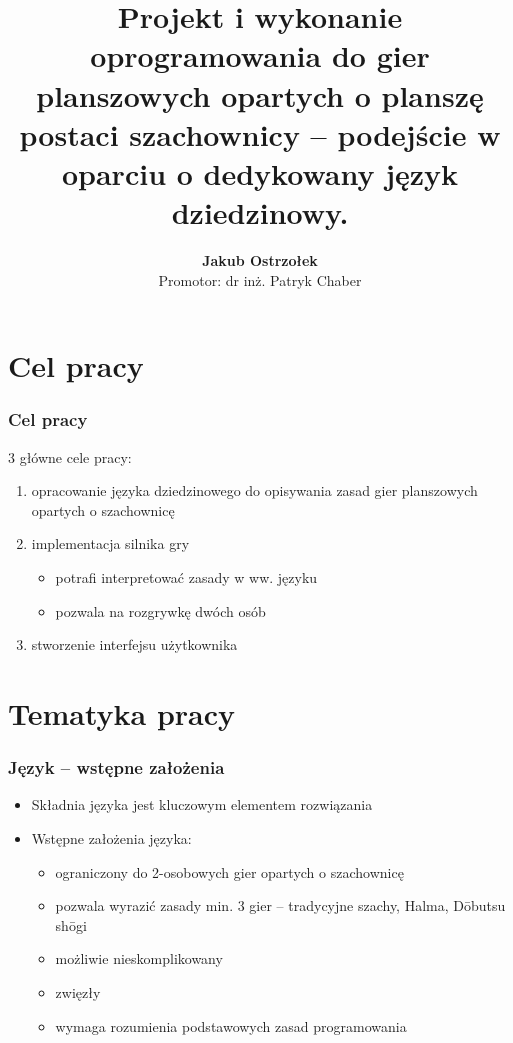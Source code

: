 \documentclass{beamer}
\title[Silnik gier opartych o szachownicę \insertframenumber/\inserttotalframenumber]{
   Projekt i wykonanie oprogramowania do gier planszowych opartych
   o planszę postaci szachownicy -- podejście w oparciu o dedykowany
   język dziedzinowy.}
\author[Jakub Ostrzołek]{\textbf{Jakub Ostrzołek} \\%
\footnotesize Promotor: dr inż. Patryk Chaber}
\institute{Instytut Automatyki i Technik Informacyjnych\\%
Politechnika Warszawska}
\begin{document}
\frame{\titlepage}


\section{Cel pracy}

\begin{frame}
	\frametitle{Cel pracy}
	3 główne cele pracy:
	\begin{enumerate}
		\item opracowanie języka dziedzinowego do opisywania zasad gier planszowych opartych o szachownicę
		\item implementacja silnika gry
		      \begin{itemize}
			      \item potrafi interpretować zasady w ww. języku
			      \item pozwala na rozgrywkę dwóch osób
		      \end{itemize}
		\item stworzenie interfejsu użytkownika
	\end{enumerate}
\end{frame}

\section{Tematyka pracy}

\begin{frame}
	\frametitle{Język -- wstępne założenia}
	\begin{itemize}
		\item Składnia języka jest kluczowym elementem rozwiązania
		\item Wstępne założenia języka:
		      \begin{itemize}
			      \item ograniczony do 2-osobowych gier opartych o szachownicę
			      \item pozwala wyrazić zasady min. 3 gier -- tradycyjne szachy, Halma, Dōbutsu shōgi
			      \item możliwie nieskomplikowany
			      \item zwięzły
			      \item wymaga rozumienia podstawowych zasad programowania
		      \end{itemize}
	\end{itemize}
\end{frame}
\end{document}
